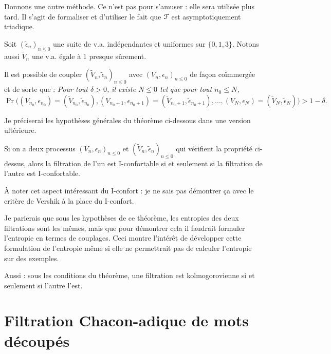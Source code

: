 \documentclass[12pt,a4paper]{article}
\begin{document}
Donnons une autre méthode. Ce n'est pas pour s'amuser : elle sera utilisée plus tard. 
Il s'agit de formaliser et d'utiliser le fait que $\EuScript{F}$ est asymptotiquement 
triadique. 

Soit ${(\widetilde{\epsilon}_n)}_{n \leq 0}$ une suite de v.a. indépendantes 
et uniformes sur $\{0,1,3\}$. Notons aussi $\widetilde{V}_n$ une v.a. égale à $1$ 
presque sûrement. 

Il est possible de coupler ${(\widetilde{V}_n, \widetilde{\epsilon}_n)}_{n \leq 0}$ 
avec ${(V_n, \epsilon_n)}_{n \leq 0}$ de façon coïmmergée et de sorte que : 
{\it Pour tout $\delta >0$, il existe $N \leq 0$ tel que pour tout $n_0 \leq N$,}
$$
\Pr\bigl((V_{n_0}, \epsilon_{n_0})=(\widetilde{V}_{n_0}, \widetilde{\epsilon}_{n_0}), (V_{n_0+1}, \epsilon_{n_0+1})=(\widetilde{V}_{n_0+1},\widetilde{\epsilon}_{n_0+1}), \ldots, (V_N, \epsilon_{N})=(\widetilde{V}_{N},\widetilde{\epsilon}_{N})\bigr) > 1-\delta. 
$$ 

Je préciserai les hypothèses générales du théorème ci-dessous dans une version ultérieure. 

\begin{thm}\label{thm:joining}
Si on a deux processus ${(V_n, \epsilon_n)}_{n \leq 0}$ et ${(\widetilde{V}_n, \widetilde{\epsilon}_n)}_{n \leq 0}$ qui vérifient la propriété ci-dessus, 
alors la filtration de l'un est I-confortable si et seulement si 
la filtration de l'autre est I-confortable.
\end{thm} 

À noter cet aspect intéressant du I-confort : 
je ne sais pas démontrer ça avec le critère de Vershik à la place du I-confort. 

Je parierais que sous les hypothèses de ce théorème, les entropies des deux 
filtrations sont les mêmes, mais que pour démontrer cela il faudrait formuler l'entropie en 
termes de couplages. Ceci montre l'intérêt de développer cette formulation 
de l'entropie même si elle ne permettrait pas de calculer l'entropie sur des exemples.

Aussi : sous les conditions du théorème, une filtration est kolmogorovienne si et seulement 
si l'autre l'est. 

\section{Filtration Chacon-adique de mots découpés}
\end{document}
